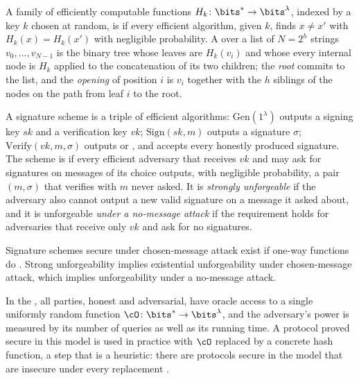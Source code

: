 \begin{refsection}
\begin{definition}\label{def:toolkit:crhf}
A family of efficiently computable functions $H_k\colon\bits^*\to\bits^\lambda$, indexed by a key $k$ chosen at random, is  if every efficient algorithm, given $k$, finds $x\ne x'$ with $H_k(x)=H_k(x')$ with negligible probability. A  over a list of $N=2^h$ strings $v_0,\dots,v_{N-1}$ is the binary tree whose leaves are $H_k(v_i)$ and whose every internal node is $H_k$ applied to the concatenation of its two children; the \emph{root} commits to the list, and the \emph{opening} of position $i$ is $v_i$ together with the $h$ siblings of the nodes on the path from leaf $i$ to the root.
\end{definition}

\begin{definition}\label{def:toolkit:signature}
A signature scheme is a triple of efficient algorithms: $\mathrm{Gen}(1^\lambda)$ outputs a signing key $sk$ and a verification key $vk$; $\mathrm{Sign}(sk,m)$ outputs a signature $\sigma$; $\mathrm{Verify}(vk,m,\sigma)$ outputs \acc{} or \rej, and accepts every honestly produced signature. The scheme is  if every efficient adversary that receives $vk$ and may ask for signatures on messages of its choice outputs, with negligible probability, a pair $(m,\sigma)$ that verifies with $m$ never asked. It is \emph{strongly unforgeable} if the adversary also cannot output a new valid signature on a message it asked about, and it is unforgeable \emph{under a no-message attack} if the requirement holds for adversaries that receive only $vk$ and ask for no signatures.
\end{definition}

Signature schemes secure under chosen-message attack exist if one-way functions do \parencite{Rompel1990}. Strong unforgeability implies existential unforgeability under chosen-message attack, which implies unforgeability under a no-message attack.

\begin{definition}\label{def:toolkit:rom}
In the , all parties, honest and adversarial, have oracle access to a single uniformly random function $\cO\colon\bits^*\to\bits^\lambda$, and the adversary's power is measured by its number of queries as well as its running time. A protocol proved secure in this model is used in practice with $\cO$ replaced by a concrete hash function, a step that is a heuristic: there are protocols secure in the model that are insecure under every replacement \parencite{CanettiGoldreichHalevi2004}.
\end{definition}


\end{refsection}
